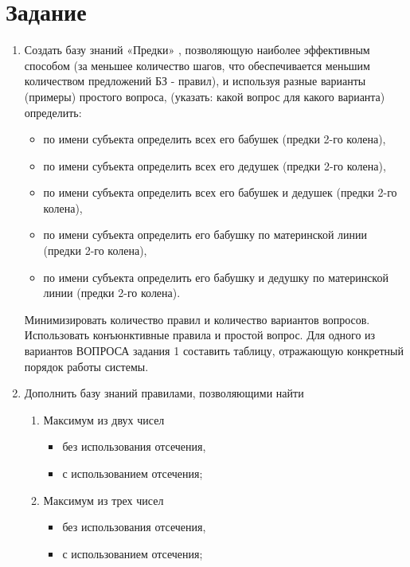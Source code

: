 \section*{Задание}

\begin{enumerate}
    \item Создать базу знаний «Предки» , позволяющую наиболее эффективным способом
          (за меньшее количество шагов, что обеспечивается меньшим количеством
          предложений БЗ - правил), и используя разные варианты (примеры) простого вопроса,
          (указать: какой вопрос для какого варианта) определить:
          \begin{itemize}
              \item по имени субъекта определить всех его бабушек (предки 2-го колена),
              \item по имени субъекта определить всех его дедушек (предки 2-го колена),
              \item по имени субъекта определить всех его бабушек и дедушек (предки 2-го колена),
              \item по имени субъекта определить его бабушку по материнской линии (предки 2-го колена),
              \item по имени субъекта определить его бабушку и дедушку по материнской линии (предки 2-го колена).
          \end{itemize}
          Минимизировать количество правил и количество вариантов вопросов. Использовать
          конъюнктивные правила и простой вопрос. Для одного из вариантов ВОПРОСА задания 1
          составить таблицу, отражающую конкретный порядок работы системы.
    \item Дополнить базу знаний правилами, позволяющими найти
          \begin{enumerate}
              \item Максимум из двух чисел
                  \begin{itemize}
                    \item без использования отсечения,
                    \item с использованием отсечения;
                  \end{itemize}
              \item Максимум из трех чисел
                  \begin{itemize}
                    \item без использования отсечения,
                    \item с использованием отсечения;
                  \end{itemize}
          \end{enumerate}
\end{enumerate}

